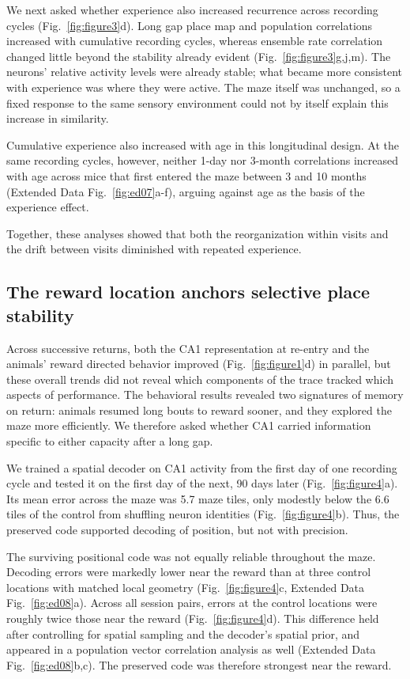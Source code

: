 \documentclass[fleqn,10pt]{wlscirep}
\begin{document}
We next asked whether experience also increased recurrence across recording cycles (Fig.~\ref{fig:figure3}d). Long gap place map and population correlations increased with cumulative recording cycles, whereas ensemble rate correlation changed little beyond the stability already evident (Fig.~\ref{fig:figure3}g,j,m). The neurons' relative activity levels were already stable; what became more consistent with experience was where they were active. The maze itself was unchanged, so a fixed response to the same sensory environment could not by itself explain this increase in similarity.

Cumulative experience also increased with age in this longitudinal design. At the same recording cycles, however, neither 1-day nor 3-month correlations increased with age across mice that first entered the maze between 3 and 10 months (Extended Data Fig.~\ref{fig:ed07}a-f), arguing against age as the basis of the experience effect.

Together, these analyses showed that both the reorganization within visits and the drift between visits diminished with repeated experience.

\subsection*{The reward location anchors selective place stability}
Across successive returns, both the CA1 representation at re-entry and the animals' reward directed behavior improved (Fig.~\ref{fig:figure1}d) in parallel, but these overall trends did not reveal which components of the trace tracked which aspects of performance. The behavioral results revealed two signatures of memory on return: animals resumed long bouts to reward sooner, and they explored the maze more efficiently. We therefore asked whether CA1 carried information specific to either capacity after a long gap.

We trained a spatial decoder on CA1 activity from the first day of one recording cycle and tested it on the first day of the next, 90 days later (Fig.~\ref{fig:figure4}a). Its mean error across the maze was 5.7 maze tiles, only modestly below the 6.6 tiles of the control from shuffling neuron identities (Fig.~\ref{fig:figure4}b). Thus, the preserved code supported decoding of position, but not with precision.

The surviving positional code was not equally reliable throughout the maze. Decoding errors were markedly lower near the reward than at three control locations with matched local geometry (Fig.~\ref{fig:figure4}c, Extended Data Fig.~\ref{fig:ed08}a). Across all session pairs, errors at the control locations were roughly twice those near the reward (Fig.~\ref{fig:figure4}d). This difference held after controlling for spatial sampling and the decoder's spatial prior, and appeared in a population vector correlation analysis as well (Extended Data Fig.~\ref{fig:ed08}b,c). The preserved code was therefore strongest near the reward.
\end{document}
